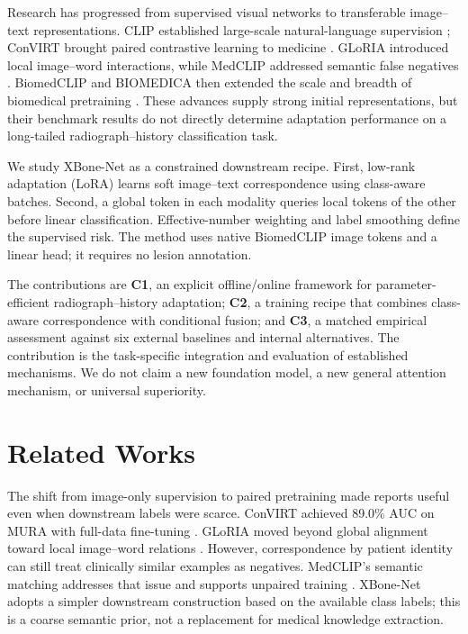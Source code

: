 \documentclass[conference,a4paper]{IEEEtran}
\begin{document}
Research has progressed from supervised visual networks \cite{ResNet,DenseNet} to transferable image--text representations. CLIP established large-scale natural-language supervision \cite{CLIP}; ConVIRT brought paired contrastive learning to medicine \cite{ConVIRT}. GLoRIA introduced local image--word interactions, while MedCLIP addressed semantic false negatives \cite{GLoRIA,MedCLIP}. BiomedCLIP and BIOMEDICA then extended the scale and breadth of biomedical pretraining \cite{BiomedCLIP,BIOMEDICA}. These advances supply strong initial representations, but their benchmark results do not directly determine adaptation performance on a long-tailed radiograph--history classification task.

We study XBone-Net as a constrained downstream recipe. First, low-rank adaptation (LoRA) \cite{Hu2022LoRA} learns soft image--text correspondence using class-aware batches. Second, a global token in each modality queries local tokens of the other before linear classification. Effective-number weighting \cite{Cui2019ClassBalanced} and label smoothing define the supervised risk. The method uses native BiomedCLIP image tokens and a linear head; it requires no lesion annotation.

The contributions are \textbf{C1}, an explicit offline/online framework for parameter-efficient radiograph--history adaptation; \textbf{C2}, a training recipe that combines class-aware correspondence with conditional fusion; and \textbf{C3}, a matched empirical assessment against six external baselines and internal alternatives. The contribution is the task-specific integration and evaluation of established mechanisms. We do not claim a new foundation model, a new general attention mechanism, or universal superiority.

\section{Related Works}
The shift from image-only supervision to paired pretraining made reports useful even when downstream labels were scarce. ConVIRT achieved 89.0\% AUC on MURA with full-data fine-tuning \cite{ConVIRT}. GLoRIA moved beyond global alignment toward local image--word relations \cite{GLoRIA}. However, correspondence by patient identity can still treat clinically similar examples as negatives. MedCLIP's semantic matching addresses that issue and supports unpaired training \cite{MedCLIP}. XBone-Net adopts a simpler downstream construction based on the available class labels; this is a coarse semantic prior, not a replacement for medical knowledge extraction.
\end{document}
